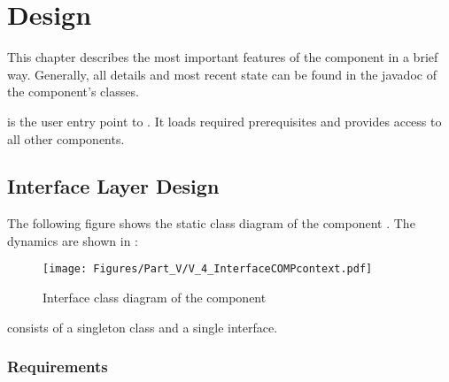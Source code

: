 
\chapter{\COMPcontext{} Design}
\label{sec:COMPcontextDesign}

This chapter describes the most important features of the \COMPcontext{} component in a brief way. Generally, all details and most recent state can be found in the javadoc of the component's classes.

\COMPcontext{} is the user entry point to \LibName{}. It loads required prerequisites and provides access to all other \LibName{} components.


\section{Interface Layer Design}
\label{sec:InterfaceDesignCOMPcontext}

The following figure shows the static class diagram of the component \COMPcontext{}. The dynamics are shown in :

\begin{figure}[H]
	\centering
	\texttt{[image: Figures/Part\_V/V\_4\_InterfaceCOMPcontext.pdf]}
	\caption{Interface class diagram of the component \COMPcontext{}}
	\label{fig:V_4_InterfaceCOMPcontext}
\end{figure}

\COMPcontext{} consists of a singleton class and a single \ComponentRegistry{} interface.


\subsection{\COMPcontext{} Requirements}
\label{sec:COMPcontextRequirements}

\newcommand{\REQUcontextStartupTasks}{REQU\_CONTEXT\_STARTUP\_TASKS}
\newcommand{\REQUcontextRobustStartup}{REQU\_CONTEXT\_ROBUST\_STARTUP}
\newcommand{\REQUcontextVerboseLogging}{REQU\_CONTEXT\_VERBOSE\_LOGGING}

